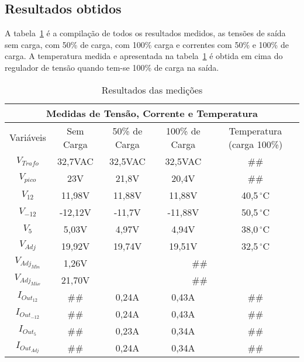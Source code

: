 \documentclass[
	article,			%
	11pt,				%
	oneside,			%
	a4paper,			%
	english,			%
	brazil,				%
	sumario=tradicional
	]{abntex2}
\begin{document}
\subsection{Resultados obtidos}
A tabela~\ref{tab:TABLE_medidas} é a compilação de todos os resultados medidos, as tensões de saída sem carga, com 50\% de carga, com 100\% carga e correntes com 50\% e 100\% de carga. A temperatura medida e apresentada na tabela~\ref{tab:TABLE_medidas} é obtida em cima do regulador de tensão quando tem-se 100\% de carga na saída.
\begin{table}[htb!]
  \centering
  \caption{Resultados das medições}
  \label{tab:TABLE_medidas}
  \begin{tabular}{|c|c|c|c|c|}
    \hline
    \multicolumn{5}{|c|}{\textbf{Medidas de Tensão, Corrente e Temperatura}}\\	\hline
    Variáveis&Sem Carga&50\% de Carga&100\% de Carga&Temperatura (carga 100\%)\\	\hline\hline
    $V_{Trafo}$&32,7VAC&32,5VAC&32,5VAC&\#\#\\	\hline
	$V_{pico}$&23V&21,8V&20,4V&\#\#\\	\hline
	$V_{12}$&11,98V&11,88V&11,88V&40,5$\,^{\circ}\mathrm{C}$\\	\hline
	$V_{-12}$&-12,12V&-11,7V&-11,88V&50,5$\,^{\circ}\mathrm{C}$ \\	\hline
	$V_{5}$&5,03V&4,97V&4,94V&38,0$\,^{\circ}\mathrm{C}$\\	\hline
	$V_{Adj}$&19,92V&19,74V&19,51V&32,5$\,^{\circ}\mathrm{C}$ \\ \hline
	$V_{Adj_{Mín}}$&1,26V&\multicolumn{3}{|c|}{\#\#}\\ \hline
	$V_{Adj_{Máx}}$&21,70V&\multicolumn{3}{|c|}{\#\#}\\ \hline\hline
	$I_{Out_{12}}$&\#\# &0,24A&0,43A&\#\#\\	\hline
	$I_{Out_{-12}}$&\#\# &0,24A&0,43A&\#\# \\	\hline
	$I_{Out_{5}}$&\#\# &0,23A&0,34A&\#\#\\	\hline
	$I_{Out_{Adj}}$&\#\# &0,24A&0,34A&\#\#\\	\hline\hline
  \end{tabular}
\end{table}
\end{document}
